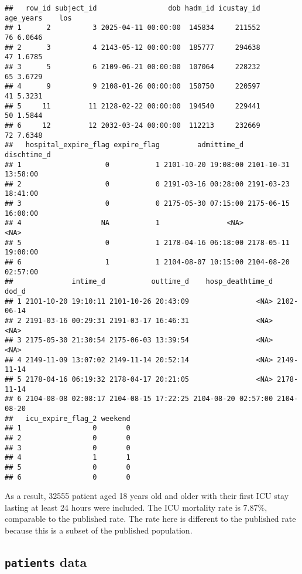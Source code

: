 \documentclass[
]{article}
\begin{document}
\begin{verbatim}
##   row_id subject_id                 dob hadm_id icustay_id age_years    los
## 1      2          3 2025-04-11 00:00:00  145834     211552        76 6.0646
## 2      3          4 2143-05-12 00:00:00  185777     294638        47 1.6785
## 3      5          6 2109-06-21 00:00:00  107064     228232        65 3.6729
## 4      9          9 2108-01-26 00:00:00  150750     220597        41 5.3231
## 5     11         11 2128-02-22 00:00:00  194540     229441        50 1.5844
## 6     12         12 2032-03-24 00:00:00  112213     232669        72 7.6348
##   hospital_expire_flag expire_flag         admittime_d         dischtime_d
## 1                    0           1 2101-10-20 19:08:00 2101-10-31 13:58:00
## 2                    0           0 2191-03-16 00:28:00 2191-03-23 18:41:00
## 3                    0           0 2175-05-30 07:15:00 2175-06-15 16:00:00
## 4                   NA           1                <NA>                <NA>
## 5                    0           1 2178-04-16 06:18:00 2178-05-11 19:00:00
## 6                    1           1 2104-08-07 10:15:00 2104-08-20 02:57:00
##              intime_d           outtime_d    hosp_deathtime_d      dod_d
## 1 2101-10-20 19:10:11 2101-10-26 20:43:09                <NA> 2102-06-14
## 2 2191-03-16 00:29:31 2191-03-17 16:46:31                <NA>       <NA>
## 3 2175-05-30 21:30:54 2175-06-03 13:39:54                <NA>       <NA>
## 4 2149-11-09 13:07:02 2149-11-14 20:52:14                <NA> 2149-11-14
## 5 2178-04-16 06:19:32 2178-04-17 20:21:05                <NA> 2178-11-14
## 6 2104-08-08 02:08:17 2104-08-15 17:22:25 2104-08-20 02:57:00 2104-08-20
##   icu_expire_flag_2 weekend
## 1                 0       0
## 2                 0       0
## 3                 0       0
## 4                 1       1
## 5                 0       0
## 6                 0       0
\end{verbatim}

As a result, 32555 patient aged 18 years old and older with their first
ICU stay lasting at least 24 hours were included. The ICU mortality rate
is 7.87\%, comparable to the published rate. The rate here is different
to the published rate because this is a subset of the published
population.

\hypertarget{patients-data}{%
\subsection{\texorpdfstring{\texttt{patients}
data}{patients data}}\label{patients-data}}
\end{document}
